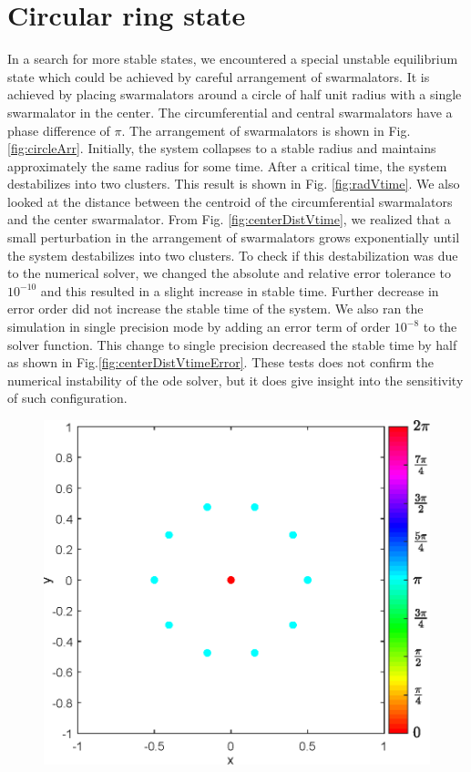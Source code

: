 \documentclass[twocolumn,10pt]{asme2ej}
\begin{document}
\section{Circular ring state}
{
    In a search for more stable states, we encountered a special unstable equilibrium state which could be achieved by careful arrangement of swarmalators. It is achieved by placing swarmalators around a circle of half unit radius with a single swarmalator in the center. The circumferential and central swarmalators have a phase difference of \(\pi\). The arrangement of swarmalators is shown in Fig. \ref{fig:circleArr}. Initially, the system collapses to a stable radius and maintains approximately the same radius for some time. After a critical time, the system destabilizes into two clusters. This result is shown in Fig. \ref{fig:radVtime}. We also looked at the distance between the centroid of the circumferential swarmalators and the center swarmalator. From Fig. \ref{fig:centerDistVtime}, we realized that a small perturbation in the arrangement of swarmalators grows exponentially until the system destabilizes into two clusters. To check if this destabilization was due to the numerical solver, we changed the absolute and relative error tolerance to \(10^{-10}\) and this resulted in a slight increase in stable time. Further decrease in error order did not increase the stable time of the system. We also ran the simulation in single precision mode by adding an error term of order \(10^{-8}\) to the solver function. This change to single precision decreased the stable time by half as shown in Fig.\ref{fig:centerDistVtimeError}. These tests does not confirm the numerical instability of the ode solver, but it does give insight into the sensitivity of such configuration. 
    \begin{figure}[h!]
        \includegraphics[width = \linewidth]{circleArrangment.eps}

\end{figure}}
\end{document}
